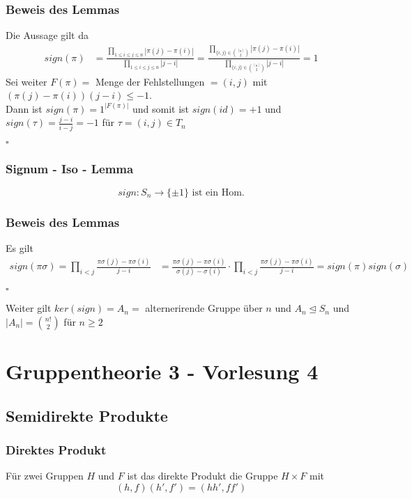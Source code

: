 \documentclass[12pt, german]{article}
\newcommand\ddfrac[2]{\frac{\displaystyle #1}{\displaystyle #2}}
\newcommand{\bewiesen}{

\begin{flushright}
		$\square$  \\
\end{flushright}}
\begin{document}
\subsubsection{Beweis des Lemmas}
	Die Aussage gilt da 
	\begin{align*}
		sign(\pi) &= \ddfrac{\prod_{1 \leq i \leq j \leq n}  |\pi(j) - \pi(i)|}{\prod_{1 \leq i \leq j \leq n}  |j -i|} = \ddfrac{ \prod_{ \{i,j\} \in \binom{[n]}{2}} |\pi(j) - \pi(i)| }{ \prod_{ \{i,j\} \in \binom{[n]}{2}} |j - i|} = 1
	\end{align*}
	Sei weiter $F(\pi) = $ Menge der Fehlstellungen $= (i,j)$ mit $(\pi(j) - \pi(i))(j-i) \leq -1$. \\
	
	Dann ist $sign(\pi)= 1^{|F(\pi)|}$ und somit ist $sign(id) = +1$ und $sign(\tau) = \frac{j-i}{i-j} = -1$ für $\tau= (i,j) \in T_n$
	\bewiesen

\subsubsection{Signum - Iso - Lemma}
	$$ sign: S_n \to \{ \pm 1\} \text{ ist ein Hom.}$$

\subsubsection{Beweis des Lemmas}
	Es gilt 
	\begin{align*}
		sign(\pi\sigma) = \prod_{ i < j} \ddfrac{\pi\sigma(j) - \pi \sigma(i)}{j -i} &=  \ddfrac{\pi\sigma(j) - \pi \sigma(i)}{\sigma(j) -\sigma(i)} \cdot \prod_{ i < j}\ddfrac{\pi\sigma(j) - \pi \sigma(i)}{j -i} = sign(\pi) sign(\sigma)
	\end{align*}
	\bewiesen
	Weiter gilt $ker(sign) = A_n = $ alternerirende Gruppe über $n$ und $A_n \trianglelefteq S_n$ und $|A_n| = \binom{n!}{2}$ für $n \geq 2$ 

\section{Gruppentheorie 3 - Vorlesung 4}
\subsection{Semidirekte Produkte}
\subsubsection{Direktes Produkt}
	Für zwei Gruppen $H$ und $F$ ist das direkte Produkt die Gruppe $H \times F$ mit  $$(h,f)(h', f') = (hh', ff')$$
\end{document}
